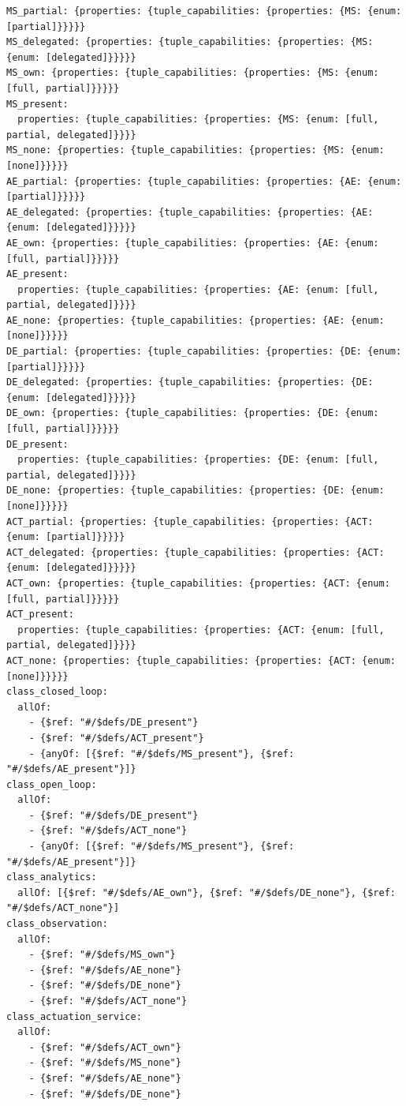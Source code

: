\begin{verbatim}
MS_partial: {properties: {tuple_capabilities: {properties: {MS: {enum: [partial]}}}}}
MS_delegated: {properties: {tuple_capabilities: {properties: {MS: {enum: [delegated]}}}}}
MS_own: {properties: {tuple_capabilities: {properties: {MS: {enum: [full, partial]}}}}}
MS_present:
  properties: {tuple_capabilities: {properties: {MS: {enum: [full, partial, delegated]}}}}
MS_none: {properties: {tuple_capabilities: {properties: {MS: {enum: [none]}}}}}
AE_partial: {properties: {tuple_capabilities: {properties: {AE: {enum: [partial]}}}}}
AE_delegated: {properties: {tuple_capabilities: {properties: {AE: {enum: [delegated]}}}}}
AE_own: {properties: {tuple_capabilities: {properties: {AE: {enum: [full, partial]}}}}}
AE_present:
  properties: {tuple_capabilities: {properties: {AE: {enum: [full, partial, delegated]}}}}
AE_none: {properties: {tuple_capabilities: {properties: {AE: {enum: [none]}}}}}
DE_partial: {properties: {tuple_capabilities: {properties: {DE: {enum: [partial]}}}}}
DE_delegated: {properties: {tuple_capabilities: {properties: {DE: {enum: [delegated]}}}}}
DE_own: {properties: {tuple_capabilities: {properties: {DE: {enum: [full, partial]}}}}}
DE_present:
  properties: {tuple_capabilities: {properties: {DE: {enum: [full, partial, delegated]}}}}
DE_none: {properties: {tuple_capabilities: {properties: {DE: {enum: [none]}}}}}
ACT_partial: {properties: {tuple_capabilities: {properties: {ACT: {enum: [partial]}}}}}
ACT_delegated: {properties: {tuple_capabilities: {properties: {ACT: {enum: [delegated]}}}}}
ACT_own: {properties: {tuple_capabilities: {properties: {ACT: {enum: [full, partial]}}}}}
ACT_present:
  properties: {tuple_capabilities: {properties: {ACT: {enum: [full, partial, delegated]}}}}
ACT_none: {properties: {tuple_capabilities: {properties: {ACT: {enum: [none]}}}}}
class_closed_loop:
  allOf:
    - {$ref: "#/$defs/DE_present"}
    - {$ref: "#/$defs/ACT_present"}
    - {anyOf: [{$ref: "#/$defs/MS_present"}, {$ref: "#/$defs/AE_present"}]}
class_open_loop:
  allOf:
    - {$ref: "#/$defs/DE_present"}
    - {$ref: "#/$defs/ACT_none"}
    - {anyOf: [{$ref: "#/$defs/MS_present"}, {$ref: "#/$defs/AE_present"}]}
class_analytics:
  allOf: [{$ref: "#/$defs/AE_own"}, {$ref: "#/$defs/DE_none"}, {$ref: "#/$defs/ACT_none"}]
class_observation:
  allOf:
    - {$ref: "#/$defs/MS_own"}
    - {$ref: "#/$defs/AE_none"}
    - {$ref: "#/$defs/DE_none"}
    - {$ref: "#/$defs/ACT_none"}
class_actuation_service:
  allOf:
    - {$ref: "#/$defs/ACT_own"}
    - {$ref: "#/$defs/MS_none"}
    - {$ref: "#/$defs/AE_none"}
    - {$ref: "#/$defs/DE_none"}
\end{verbatim}

